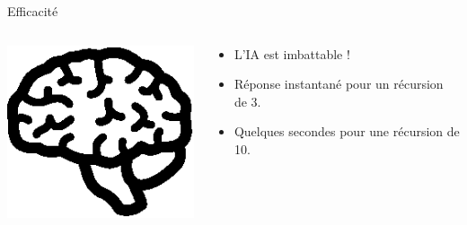 \documentclass[compress, 12pt]{beamer}
\begin{document}
\begin{frame}{Efficacité}
    \begin{columns}
        \begin{column}{.2\textwidth}
            \includegraphics[width=1.3\textwidth]{./pix/sym_brain}
        \end{column}
        \begin{column}{.6\textwidth}
        \begin{itemize}
            \itemsep2em
	        \item L'IA est imbattable !
	        \item Réponse instantané pour un récursion de 3.
	        \item Quelques secondes pour une récursion de 10.
        \end{itemize}
        \end{column}
    \end{columns}
\end{frame}
\end{document}

